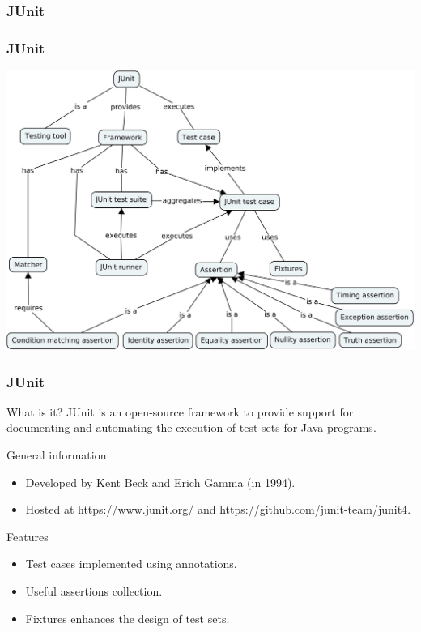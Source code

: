 \begin{frame}[c, parent={cmap:software-testing}, hasprev=false, hasnext=true]
\frametitle{JUnit}
\label{cmap:junit}

\end{frame}


\begin{frame}[c, parent={cmap:software-testing}, hasprev=true, hasnext=false]
\frametitle{JUnit}
\centering
\includegraphics[width=\textwidth]{JUnit.jpg}
\end{frame}


\begin{frame}[parent={cmap:junit}, hasprev=false, hasnext=true]
\frametitle{JUnit}
\label{concept:junit}

\begin{block:concept}{What is it?}
JUnit is an open-source framework to provide support for documenting and
automating the execution of test sets for Java programs.
\end{block:concept}


\begin{block:fact}{General information}
\begin{itemize}
	\item Developed by Kent Beck and Erich Gamma (in 1994).

	\item Hosted at \url{https://www.junit.org/} and
	\url{https://github.com/junit-team/junit4}.
\end{itemize}
\end{block:fact}


\begin{block:fact}{Features}
\begin{itemize}
	\item Test cases implemented using annotations.

	\item Useful assertions collection.

	\item Fixtures enhances the design of test sets.
\end{itemize}
\end{block:fact}

\hfill
{}
\end{frame}



